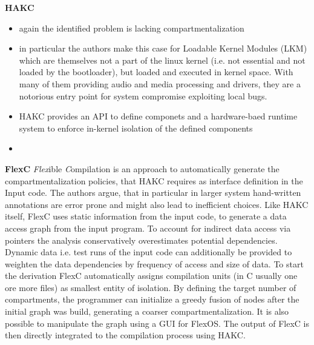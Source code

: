  \textbf{HAKC}
 \begin{itemize}
     \item again the identified problem is lacking compartmentalization 
     \item in particular the authors make this case for Loadable Kernel Modules (LKM) which are themselves not a part of the linux kernel (i.e. not essential and not loaded by the bootloader), but loaded and executed in kernel space. With many of them providing audio and media processing and drivers, they are a notorious entry point for system compromise exploiting local bugs.
     \item HAKC provides an API to define componets and a hardware-baed runtime system to enforce in-kernel isolation of the defined components
     \item 
 \end{itemize}

 \textbf{FlexC} 
 \emph{Flex}ible \emph{C}ompilation is an approach to automatically generate the compartmentalization policies, that HAKC requires as interface definition in the Input code. The authors argue, that in particular in larger system hand-written annotations are error prone and might also lead to inefficient choices. Like HAKC itself, FlexC uses static information from the input code, to generate a data access graph from the input program. To account for indirect data access via pointers the analysis conservatively overestimates potential dependencies. Dynamic data i.e. test runs of the input code can additionally be provided to weighten the data dependencies by frequency of access and size of data. To start the derivation FlexC automatically assigns compilation units (in C usually one ore more files) as smallest entity of isolation. By defining the target number of compartments, the programmer can initialize a greedy fusion of nodes after the initial graph was build, generating a coarser compartmentalization. It is also possible to manipulate the graph using a GUI for FlexOS. The output of FlexC is then directly integrated to the compilation process using HAKC.



